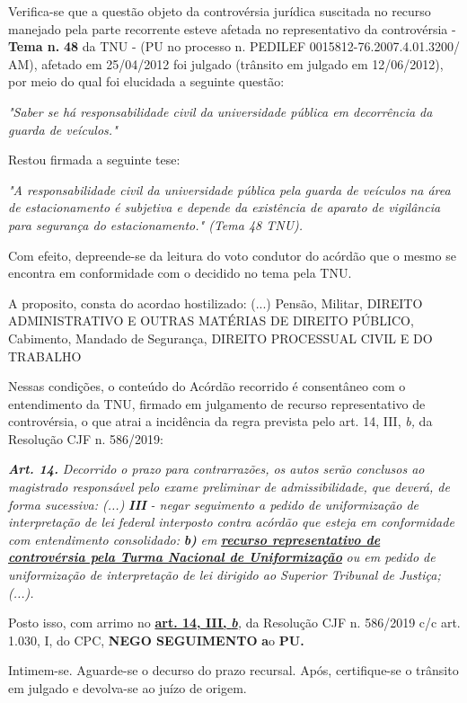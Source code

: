\documentclass[12pt]{article}
\begin{document}
\justifying
\noindent Verifica-se que a questão objeto da controvérsia jurídica suscitada no recurso manejado pela parte recorrente esteve afetada no representativo da controvérsia - \textbf{Tema n. }\textbf{48} da TNU - (PU no processo n. PEDILEF 0015812-76.2007.4.01.3200/ AM),  afetado em 25/04/2012 foi julgado (trânsito em julgado em 12/06/2012), por meio do qual foi elucidada a seguinte questão:

\noindent \textit{"Saber se há responsabilidade civil da universidade pública em decorrência da guarda de veículos."}

\noindent Restou firmada a seguinte tese:

\noindent \textit{"A responsabilidade civil da universidade pública pela guarda de veículos na área de estacionamento é subjetiva e depende da existência de aparato de vigilância para segurança do estacionamento." (Tema 48 TNU).}

\noindent Com efeito, depreende-se da leitura do voto condutor do acórdão que o mesmo se encontra em conformidade com o decidido no  tema pela TNU.

\noindent A proposito, consta do acordao hostilizado: (...) Pensão, Militar, DIREITO ADMINISTRATIVO E OUTRAS MATÉRIAS DE DIREITO PÚBLICO, Cabimento, Mandado de Segurança, DIREITO PROCESSUAL CIVIL E DO TRABALHO

\noindent Nessas condições, o conteúdo do Acórdão recorrido é consentâneo com o entendimento da TNU, firmado em julgamento de recurso representativo de controvérsia, o que atrai a incidência da regra prevista pelo art. 14, III, \textit{b,} da Resolução CJF n. 586/2019:

\noindent \textit{\textbf{Art. 14.}}\textit{ Decorrido o prazo para contrarrazões, os autos serão conclusos ao magistrado responsável pelo exame preliminar de admissibilidade, que deverá, de forma sucessiva: (...) }\textit{\textbf{III }}\textit{- negar seguimento a pedido de uniformização de interpretação de lei federal interposto contra acórdão que esteja em conformidade com entendimento consolidado: }\textit{\textbf{b)}}\textit{ em }\uline{\textit{\textbf{recurso representativo de controvérsia pela Turma Nacional de Uniformização}}}\textit{ ou em pedido de uniformização de interpretação de lei dirigido ao Superior Tribunal de Justiça;(...).}

\noindent Posto isso, com arrimo no \uline{\textbf{art. 14, III, }}\uline{\textit{\textbf{b}}}\textit{,} da Resolução CJF n. 586/2019 c/c art. 1.030, I, do CPC, \textbf{NEGO SEGUIMENTO }\textbf{a}o\textbf{ PU}\textbf{.}

\noindent Intimem-se. Aguarde-se o decurso do prazo recursal. Após, certifique-se o trânsito em julgado e devolva-se ao juízo de origem.
\end{document}
